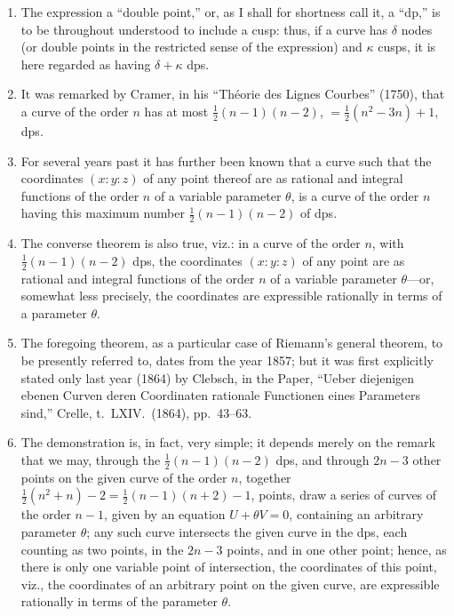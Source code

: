 \documentclass[12pt,a4paper]{article}
\theoremstyle{plain}
\theoremstyle{definition}
\theoremstyle{remark}
\begin{document}
\begin{enumerate}[label=\arabic*.]
\item The expression a ``double point,'' or, as I shall for shortness call it, a ``dp,'' is to be throughout understood to include a cusp: thus, if a curve has $\delta$ nodes (or double points in the restricted sense of the expression) and $\kappa$ cusps, it is here regarded as having $\delta + \kappa$ dps.

\item It was remarked by Cramer, in his ``Th\'{e}orie des Lignes Courbes'' (1750), that a curve of the order $n$ has at most $\frac{1}{2}(n-1)(n-2)$, $= \frac{1}{2}(n^2 - 3n) + 1$, dps.

\item For several years past it has further been known that a curve such that the coordinates $(x:y:z)$ of any point thereof are as rational and integral functions of the order $n$ of a variable parameter $\theta$, is a curve of the order $n$ having this maximum number $\frac{1}{2}(n-1)(n-2)$ of dps.

\item The converse theorem is also true, viz.: in a curve of the order $n$, with $\frac{1}{2}(n-1)(n-2)$ dps, the coordinates $(x:y:z)$ of any point are as rational and integral functions of the order $n$ of a variable parameter $\theta$---or, somewhat less precisely, the coordinates are expressible rationally in terms of a parameter $\theta$.

\item The foregoing theorem, as a particular case of Riemann's general theorem, to be presently referred to, dates from the year 1857; but it was first explicitly stated only last year (1864) by Clebsch, in the Paper, ``Ueber diejenigen ebenen Curven deren Coordinaten rationale Functionen eines Parameters sind,'' Crelle, t.~LXIV.\ (1864), pp.~43--63.

\item The demonstration is, in fact, very simple; it depends merely on the remark that we may, through the $\frac{1}{2}(n-1)(n-2)$ dps, and through $2n-3$ other points on the given curve of the order $n$, together $\frac{1}{2}(n^2+n) - 2 = \frac{1}{2}(n-1)(n+2) - 1$, points, draw a series of curves of the order $n-1$, given by an equation $U + \theta V = 0$, containing an arbitrary parameter $\theta$; any such curve intersects the given curve in the dps, each counting as two points, in the $2n-3$ points, and in one other point; hence, as there is only one variable point of intersection, the coordinates of this point, viz., the coordinates of an arbitrary point on the given curve, are expressible rationally in terms of the parameter $\theta$.


\end{enumerate}
\end{document}
